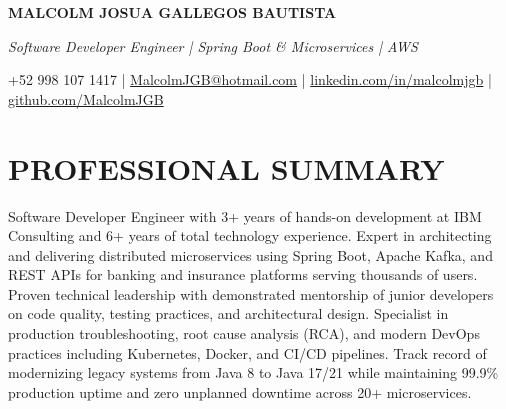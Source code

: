 \documentclass[10pt,a4paper]{article}
\newlength{\namefontsize}
\newlength{\documentfontsize}
\newlength{\singlelinespacing}
\newlength{\singleseparation}
\begin{document}
\fontsize{\documentfontsize}{\singlelinespacing} \selectfont
{\fontsize{\namefontsize}{\singlelinespacing} \selectfont \bfseries MALCOLM JOSUA GALLEGOS BAUTISTA} \par
\textit{Software Developer Engineer | Spring Boot \& Microservices | AWS} \par
{+52 998 107 1417 | \href{mailto:MalcolmJGB@hotmail.com}{MalcolmJGB@hotmail.com} | \href{https://linkedin.com/in/malcolmjgb}{linkedin.com/in/malcolmjgb} | \href{https://github.com/MalcolmJGB}{github.com/MalcolmJGB}} \par

\section*{PROFESSIONAL SUMMARY}
\vspace{\singleseparation}
Software Developer Engineer with 3+ years of hands-on development at IBM Consulting and 6+ years of total technology experience. Expert in architecting and delivering distributed microservices using Spring Boot, Apache Kafka, and REST APIs for banking and insurance platforms serving thousands of users. Proven technical leadership with demonstrated mentorship of junior developers on code quality, testing practices, and architectural design. Specialist in production troubleshooting, root cause analysis (RCA), and modern DevOps practices including Kubernetes, Docker, and CI/CD pipelines. Track record of modernizing legacy systems from Java 8 to Java 17/21 while maintaining 99.9\% production uptime and zero unplanned downtime across 20+ microservices. \par
\end{document}
